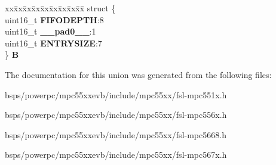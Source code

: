\begin{DoxyCompactItemize}
\begin{tabbing}
\end{tabbing}\item 
\mbox{\label{unionuRFDSR_a64d39cf39da5b29d27dedb2f083e9774}} 
\begin{tabbing}
xx\=xx\=xx\=xx\=xx\=xx\=xx\=xx\=xx\=\kill
struct \{\\
\>uint16\_t {\bfseries FIFODEPTH}:8\\
\>uint16\_t {\bfseries \_\_pad0\_\_}:1\\
\>uint16\_t {\bfseries ENTRYSIZE}:7\\
\} {\bfseries B}\\

\end{tabbing}\end{DoxyCompactItemize}


The documentation for this union was generated from the following files\+:\begin{DoxyCompactItemize}
\item 
bsps/powerpc/mpc55xxevb/include/mpc55xx/fsl-\/mpc551x.\+h\item 
bsps/powerpc/mpc55xxevb/include/mpc55xx/fsl-\/mpc556x.\+h\item 
bsps/powerpc/mpc55xxevb/include/mpc55xx/fsl-\/mpc5668.\+h\item 
bsps/powerpc/mpc55xxevb/include/mpc55xx/fsl-\/mpc567x.\+h\end{DoxyCompactItemize}
